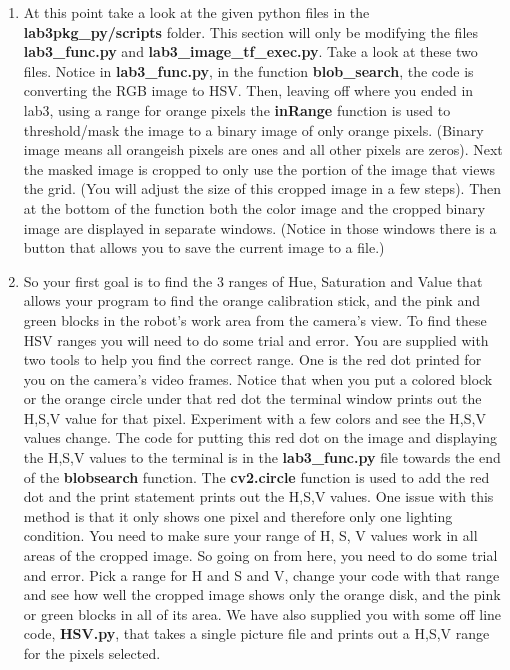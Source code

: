 \begin{enumerate}
\item At this point take a look at the given python files in the \textbf{lab3pkg\_py/scripts} folder. This section will only be modifying the files \textbf{lab3\_func.py} and \textbf{lab3\_image\_tf\_exec.py}.  Take a look at these two files.  Notice in \textbf{lab3\_func.py}, in the function \textbf{blob\_search}, the code is converting the RGB image to HSV.  Then, leaving off where you ended in lab3, using a range for orange pixels the \textbf{inRange} function is used to threshold/mask the image to a binary image of only orange pixels. (Binary image means all orangeish pixels are ones and all other pixels are zeros).  Next the masked image is cropped to only use the portion of the image that views the grid.  (You will adjust the size of this cropped image in a few steps).  Then at the bottom of the function both the color image and the cropped binary image are displayed in separate windows.  (Notice in those windows there is a button that allows you to save the current image to a file.)
  
\item So your first goal is to find the 3 ranges of Hue, Saturation and Value that allows your program to find the orange calibration stick, and the pink and green blocks in the robot's work area from the camera's view.  To find these HSV ranges you will need to do some trial and error.  You are supplied with two tools to help you find the correct range.  One is the red dot printed for you on the camera’s video frames.  Notice that when you put a colored block or the orange circle under that red dot the terminal window prints out the H,S,V value for that pixel.  Experiment with a few colors and see the H,S,V values change.  The code for putting this red dot on the image and displaying the H,S,V values to the terminal is in the \textbf{lab3\_func.py} file towards the end of the \textbf{blobsearch} function.  The \textbf{cv2.circle} function is used to add the red dot and the print statement prints out the H,S,V values.   
One issue with this method is that it only shows one pixel and therefore only one lighting condition.  You need to make sure your range of H, S, V values work in all areas of the cropped image.  So going on from here, you need to do some trial and error.  Pick a range for H and S and V, change your code with that range and see how well the cropped image shows only the orange disk, and the pink or green blocks in all of its area.  We have also supplied you with some off line code, \textbf{HSV.py}, that takes a single picture file and prints out a H,S,V range for the pixels selected.   


\end{enumerate}
